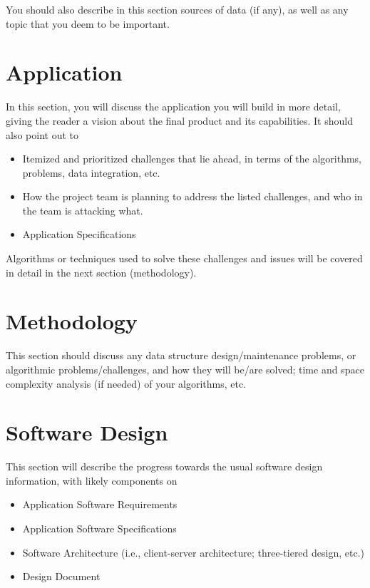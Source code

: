 \documentclass[letterpaper,12pt]{article}
\begin{document}
You should also describe in this section sources of data (if any), as well as
any topic that you deem to be important.

\newpage



\section{Application}
In this section, you will discuss the application you will build in more detail,
giving the reader a vision about the final product and its capabilities. It
should also point out to

\begin{itemize}
  \item Itemized and prioritized challenges that lie ahead, in terms of the
  algorithms, problems, data integration, etc.
  \item How the project team is planning to address the listed challenges, and
  who in the team is attacking what.
  \item Application Specifications 
\end{itemize}

Algorithms or techniques used to solve these challenges and issues will be
covered in detail in the next section (methodology).

\newpage



\section{Methodology}
This section should discuss any data structure design/maintenance problems, or
algorithmic problems/challenges, and how they will be/are solved; time and space
complexity analysis (if needed) of your algorithms, etc.

\newpage



\section{Software Design}
This section will describe the progress towards the usual software design
information, with likely components on

\begin{itemize}
  \item Application Software Requirements
  \item Application Software Specifications
  \item Software Architecture (i.e., client-server architecture; three-tiered
  design, etc.)
  \item Design Document
\end{itemize}
\end{document}
